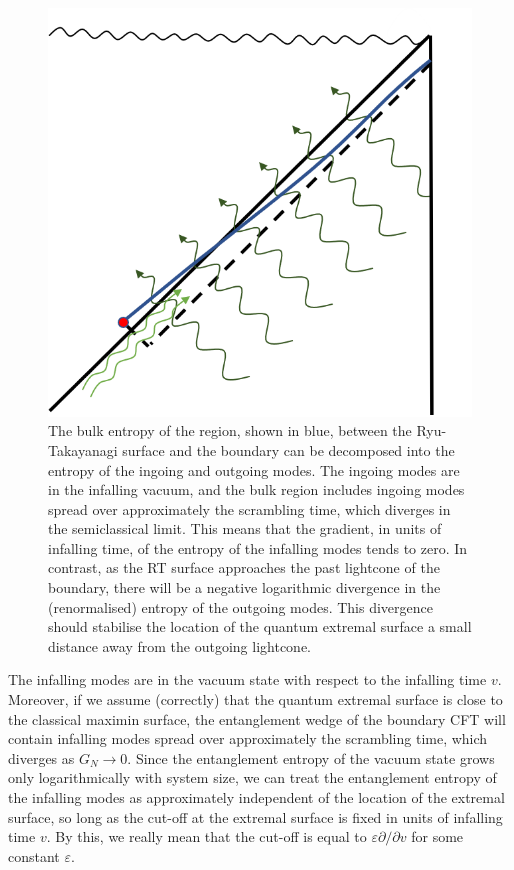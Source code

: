 \documentclass[11pt,a4paper]{article}
\begin{document}
\begin{figure}[t]
\includegraphics[width = 0.5\linewidth]{Cauchy.png}
\centering
\caption{The bulk entropy of the region, shown in blue, between the Ryu-Takayanagi surface and the boundary can be decomposed into the entropy of the ingoing and outgoing modes. The ingoing modes are in the infalling vacuum, and the bulk region includes ingoing modes spread over approximately the scrambling time, which diverges in the semiclassical limit. This means that the gradient, in units of infalling time, of the entropy of the infalling modes tends to zero. In contrast, as the RT surface approaches the past lightcone of the boundary, there will be a negative logarithmic divergence in the (renormalised) entropy of the outgoing modes. This divergence should stabilise the location of the quantum extremal surface a small distance away from the outgoing lightcone.}
\label{fig:cauchy}
\end{figure}

The infalling modes are in the vacuum state with respect to the infalling time $v$. Moreover, if we assume (correctly) that the quantum extremal surface is close to the classical maximin surface, the entanglement wedge of the boundary CFT will contain infalling modes spread over approximately the scrambling time, which diverges as $G_N \to 0$. Since the entanglement entropy of the vacuum state grows only logarithmically with system size, we can treat the entanglement entropy of the infalling modes as approximately independent of the location of the extremal surface, so long as  the cut-off at the extremal surface is fixed in units of infalling time $v$. By this, we really mean that the cut-off is equal to $\varepsilon \partial/ \partial v$ for some constant $\varepsilon$.
\end{document}
